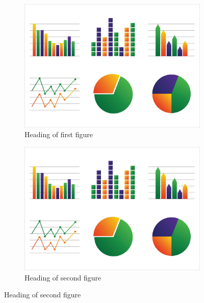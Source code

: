 \documentclass[12pt]{bppaper}
\begin{document}
\blindtext
\begin{figure}[t]
\centering
\caption{Main heading of the figure, with \texttt{[t]}}
\begin{subfigure}{0.48\textwidth}
\caption{Heading of first figure}
\includegraphics[width=1\linewidth]{graph}
\end{subfigure}
\begin{subfigure}{0.48\textwidth}
\caption{Heading of second figure}
\includegraphics[width=1\linewidth]{graph}
\end{subfigure}
\end{figure}
\blindtext

\end{document}
